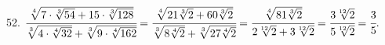52. $\cfrac{\sqrt[4]{7\cdot\sqrt[3]{54}+15\cdot\sqrt[3]{128}}}{\sqrt[3]{4\cdot\sqrt[4]{32}}+\sqrt[3]{9\cdot\sqrt[4]{162}}}=
\cfrac{\sqrt[4]{21\sqrt[3]{2}+60\sqrt[3]{2}}}{\sqrt[3]{8\sqrt[4]{2}}+\sqrt[3]{27\sqrt[4]{2}}}=
\cfrac{\sqrt[4]{81\sqrt[3]{2}}}{2\sqrt[12]{2}+3\sqrt[12]{2}}=
\cfrac{3\sqrt[12]{2}}{5\sqrt[12]{2}}=\cfrac{3}{5}.$\\
